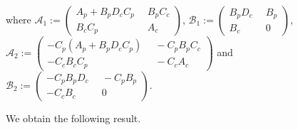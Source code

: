 \documentclass[a4paper, 9pt, twocolumn]{IEEEtran}
\theoremstyle{plain}
\theoremstyle{definition}
\begin{document}
\begin{flushleft}
\linespread{2.5}\selectfont
where $\mathcal{A}_{1} := \left(\begin{smallmatrix} A_{p} + B_{p}D_{c}C_{p} &\hspace{6pt} B_{p}C_{c}\\[6pt] B_{c}C_{p} &\hspace{6pt} A_{c} \end{smallmatrix} \right)$, $\mathcal{B}_{1} :=  \left(\begin{smallmatrix} B_{p}D_{c} &\hspace{6pt} B_{p}\\[6pt] B_{c} &\hspace{6pt} 0 \end{smallmatrix} \right)$, $\mathcal{A}_{2} := \left(\begin{smallmatrix} - C_{p}(A_{p} + B_{p}D_{c}C_{p}) &\hspace{6pt} - C_{p}B_{p}C_{c}\\[6pt] - C_{c}B_{c}C_{p} &\hspace{6pt} - C_{c}A_{c} \end{smallmatrix} \right)$ and $\mathcal{B}_{2} := \left(\begin{smallmatrix} -C_{p}B_{p}D_{c} &\hspace{6pt} - C_{p}B_{p}\\[6pt] -C_{c}B_{c} &\hspace{6pt} 0 \end{smallmatrix} \right)$.
\end{flushleft}
\vspace{6pt}
We obtain the following result.
\end{document}
